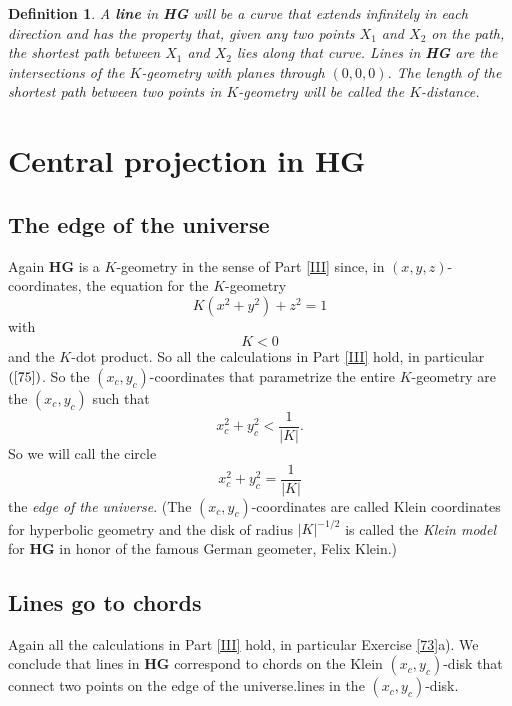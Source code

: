 \documentclass{article}%
\newtheorem{definition}[theorem]{Definition}
\begin{document}
\begin{definition}
A \textbf{line} in \textbf{HG} will be a curve that extends infinitely in each
direction and has the property that, given any two points $X_{1}$ and $X_{2}$
on the path, the shortest path between $X_{1}$ and $X_{2}$ lies along that
curve. Lines in \textbf{HG} are the intersections of the $K$-geometry with
planes through $\left(  0,0,0\right)  $. The length of the shortest path
between two points in $K$-geometry will be called the $K$-distance.\pagebreak
\end{definition}

\section{Central projection in \textbf{HG}}

\subsection{The edge of the universe}

Again \textbf{HG} is a $K$-geometry in the sense of Part \ref{III} since, in
$\left(  x,y,z\right)  $-coordinates, the equation for the $K$-geometry
\begin{equation}
K\left(  x^{2}+y^{2}\right)  +z^{2}=1 \label{74}%
\end{equation}
with%
\[
K<0
\]
and the $K$-dot product. So all the calculations in Part \ref{III} hold, in
particular $\left(  \ref{75}\right)  $. So the $\left(  x_{c},y_{c}\right)
$-coordinates that parametrize the entire $K$-geometry are the $\left(
x_{c},y_{c}\right)  $ such that%
\[
x_{c}^{2}+y_{c}^{2}<\frac{1}{\left\vert K\right\vert }.
\]
So we will call the circle%
\[
x_{c}^{2}+y_{c}^{2}=\frac{1}{\left\vert K\right\vert }%
\]
the \textit{edge of the universe}. (The $\left(  x_{c},y_{c}\right)
$-coordinates are called Klein coordinates for hyperbolic geometry and the
disk of radius $\left\vert K\right\vert ^{-1/2}$ is called the \textit{Klein
model} for \textbf{HG} in honor of the famous German geometer, Felix
Klein.)\pagebreak

\subsection{Lines go to chords}

Again all the calculations in Part \ref{III} hold, in particular Exercise
\ref{73}a). We conclude that lines in \textbf{HG} correspond to chords on the
Klein $\left(  x_{c},y_{c}\right)  $-disk that connect two points on the edge
of the universe.lines in the $\left(  x_{c},y_{c}\right)  $-disk.
\end{document}
